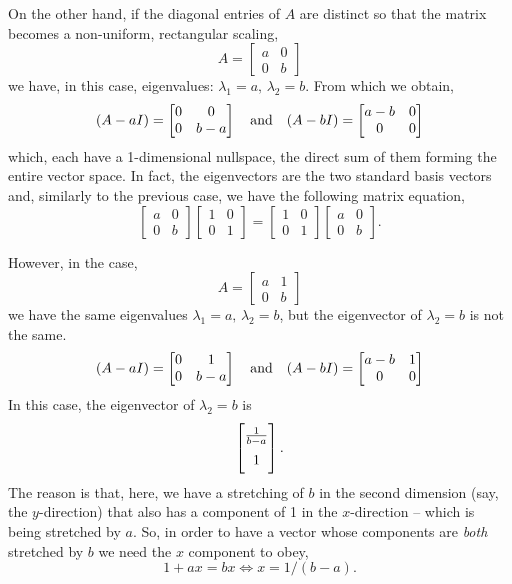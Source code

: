 \documentclass[../MathsNotesBase.tex]{subfiles}
\begin{document}
{		\bigskip
		On the other hand, if the diagonal entries of $A$ are distinct so that the matrix becomes a non-uniform, rectangular scaling,
		\[ 
		A = \begin{bmatrix}
			a & 0\\
			0 & b
		\end{bmatrix}
		\]
		we have, in this case, eigenvalues: ${ \lambda_1 = a, \, \lambda_2 = b }$. From which we obtain,
		\[ (A - aI) = 	\begin{bmatrix}
			0 & 0\\
			0 & b-a
		\end{bmatrix} \hspace{10pt}\text{and}\hspace{10pt}
		(A - bI) = 	\begin{bmatrix}
			a-b & 0\\
			0 & 0
		\end{bmatrix}	
		\]
		which, each have a 1-dimensional nullspace, the direct sum of them forming the entire vector space. In fact, the eigenvectors are the two standard basis vectors and, similarly to the previous case, we have the following matrix equation,
		\[ 
		\begin{bmatrix}
			a & 0\\
			0 & b
		\end{bmatrix}
		\begin{bmatrix}
			1 & 0\\
			0 & 1
		\end{bmatrix} =
		\begin{bmatrix}
			1 & 0\\
			0 & 1
		\end{bmatrix}
		\begin{bmatrix}
			a & 0\\
			0 & b
		\end{bmatrix}.
		\]
		
		\bigskip
		However, in the case,
		\[ 
		A = \begin{bmatrix}
			a & 1\\
			0 & b
		\end{bmatrix}
		\]
		we have the same eigenvalues ${ \lambda_1 = a, \, \lambda_2 = b }$, but the eigenvector of ${ \lambda_2 = b }$ is not the same.
		\[ (A - aI) = 	\begin{bmatrix}
			0 & 1\\
			0 & b-a
		\end{bmatrix} \hspace{10pt}\text{and}\hspace{10pt}
		(A - bI) = 	\begin{bmatrix}
			a-b & 1\\
			0 & 0
		\end{bmatrix}	
		\]
		In this case, the eigenvector of ${ \lambda_2 = b }$ is
		\[ \begin{bmatrix}\frac{1}{b-a}\nn 1\end{bmatrix}. \]
		The reason is that, here, we have a stretching of $b$ in the second dimension (say, the $y$-direction) that also has a component of 1 in the $x$-direction -- which is being stretched by $a$. So, in order to have a vector whose components are \textit{both} stretched by $b$ we need the $x$ component to obey,
		\[ 1 + ax = bx \iff x = 1/(b-a). \] 
		\\
		
}
\end{document}
